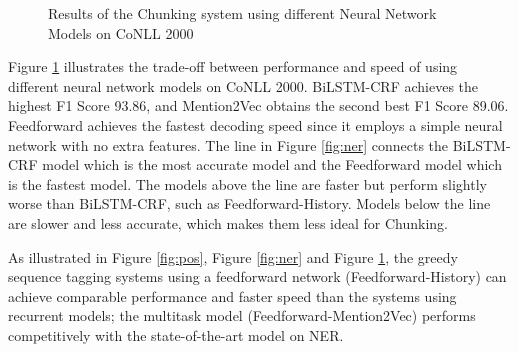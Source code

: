 \begin{figure}[h]
\centering
{}
 \caption{Results of the Chunking system using different Neural Network Models on CoNLL 2000}
  \label{fig:chunking}
\end{figure}

Figure \ref{fig:chunking} illustrates the trade-off between performance and speed of using different neural network models on CoNLL 2000. BiLSTM-CRF achieves the highest F1 Score 93.86, and Mention2Vec obtains the second best F1 Score 89.06. Feedforward achieves the fastest decoding speed since it employs a simple neural network with no extra features. The line in Figure \ref{fig:ner} connects the BiLSTM-CRF model which is the most accurate model and the Feedforward model which is the fastest model. The models above the line are faster but perform slightly worse than BiLSTM-CRF, such as Feedforward-History. Models below the line are slower and less accurate, which makes them less ideal for Chunking.

As illustrated in Figure \ref{fig:pos}, Figure \ref{fig:ner} and Figure \ref{fig:chunking}, the greedy sequence tagging systems using a feedforward network (Feedforward-History) can achieve comparable performance and faster speed than the systems using recurrent models; the multitask model (Feedforward-Mention2Vec) performs competitively with the state-of-the-art model on NER.

